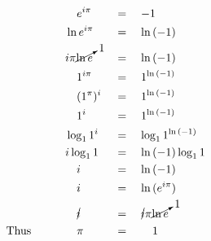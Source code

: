 \begin{alignat*}{4}
&\,&&\quad e^{i\pi}&&\,=\quad-1\\
&\,&&\ln{e^{i\pi}}&&\,=\quad\ln{(-1)}\\
&\,&&i\pi\cancelto{1}{\ln{e}}&&\,=\quad\ln{(-1)}\\
&\,&&\quad1^{i\pi}&&\,=\quad1^{\ln{(-1)}}\\
&\,&&\quad(1^\pi)^i&&\,=\quad1^{\ln{(-1)}}\\
&\,&&\quad1^i&&\,=\quad1^{\ln{(-1)}}\\
&\,&&\log_{1}1^i&&\,=\quad\log_{1}1^{\ln{(-1)}}\\
&\,&&i\log_{1}1&&\,=\quad\ln{(-1)}\log_{1}1\\
&\,&&\quad i&&\,=\quad\ln{(-1)}\\
&\,&&\quad i&&\,=\quad\ln{(e^{i\pi})}\\
&\,&&\quad\cancel{i}&&\,=\quad\cancel{i}\pi\cancelto{1}{\ln{e}}\\
&\mathrm{Thus}\qquad&&\quad\pi&&\,=\qquad1
\end{alignat*}
